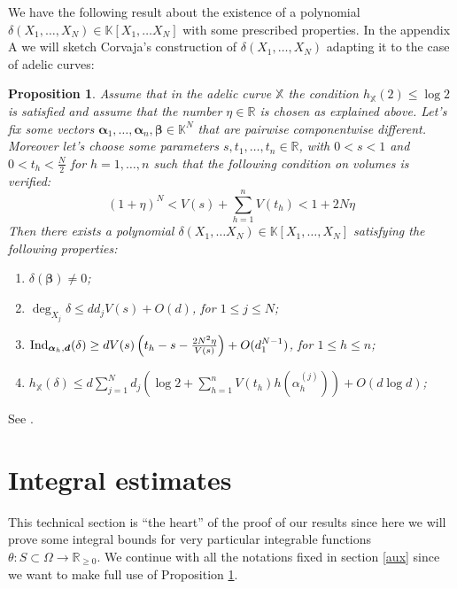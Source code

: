 \documentclass[10 pt,a4paper]{article}
\theoremstyle{plain}
\newtheorem{prop}[thm]{Proposition}
\theoremstyle{definition}
\theoremstyle{named}
\begin{document}
We have the following result about the existence of a polynomial $\delta(X_1,\ldots,X_N)\in\mathbb K[X_1,\ldots X_N]$ with some prescribed properties. In the appendix A we will sketch Corvaja's construction of $\delta(X_1,\ldots,X_N)$ adapting it to the case of adelic curves:
\begin{prop}\label{interpolationpoly} Assume that in the adelic curve $\mathbb X$ the condition $h_{\mathbb X}(2)\le \log 2$ is satisfied and assume that the number $\eta\in\mathbb R$ is chosen as explained above.   Let's fix some vectors $\bm{\alpha}_1,\ldots,\bm{\alpha}_n,\bm{\beta}\in\mathbb K^N$ that are pairwise componentwise different.  Moreover let's choose some parameters $s, t_1,\dots, t_n\in\mathbb R$, with $0<s<1$ and $0< t_h<\frac{N}{2}$ for $h=1,\dots ,n$ such that the following condition on volumes is verified:
\begin{equation}\label{basicinequality}
(1+\eta)^N<V(s)+\sum_{h=1}^{n}V(t_h)<1+2N\eta
\end{equation}
Then there exists a polynomial $\delta(X_1,\ldots X_N)\in\mathbb K[X_1,\ldots, X_N]$ satisfying the following properties:
\begin{enumerate}
\item[$(1)$] $\delta(\bm\beta)\neq 0$;
\item[$(2)$] ${\deg}_{X_{j}}\delta\leq dd_jV(s)+O(d)$,  for $1\leq j\leq N$;
\item[$(3)$] ${\rm{Ind}}_{\bm{\alpha}_h,\bm{d}}(\delta)\geq dV(s)\left ( t_h-s-\frac{2N^2\eta}{V(s)} \right)+ O(d^{N-1}_1) $,  for $1\leq h\leq n$;
\item[$(4)$] $\displaystyle h_{\mathbb X}(\delta)\leq d\sum_{j=1}^{N}d_j\left( \log 2+   \sum_{h=1}^{n}V(t_h)h(\alpha^{(j)}_{h})\right)+O(d\log d)$;
\end{enumerate}
\end{prop}
\proof
See \cite[Proposition 2.6]{C}.
\endproof




\section{Integral estimates}\label{estimates}
This technical section is ``the heart'' of the proof of our results since here we will prove some integral bounds for very particular integrable functions $\theta:S\subset\Omega\to \mathbb R_{\ge 0}$. We continue with all the notations fixed in section \ref{aux} since we want to make full use of Proposition \ref{interpolationpoly}. 
\end{document}
